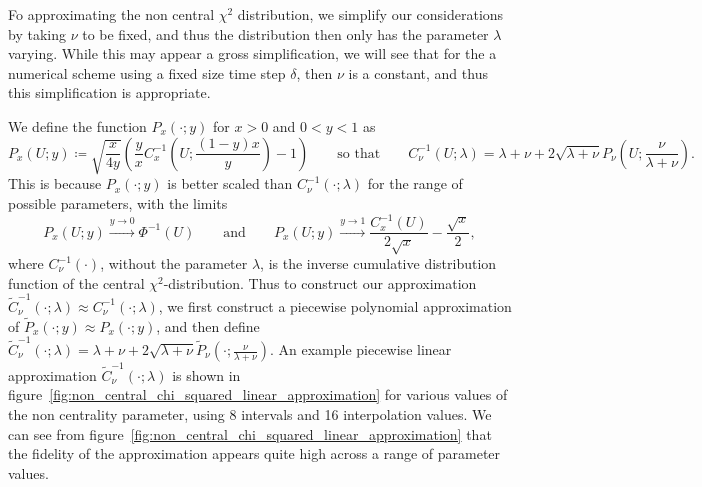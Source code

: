 \documentclass[manuscript,review]{acmart}
\begin{document}
Fo approximating the non central $ \chi^2 $ distribution, we simplify our considerations by taking $ \nu $ to be fixed, and thus the distribution then only has the parameter $ \lambda $ varying. While this may appear a gross simplification, we will see that for the a numerical scheme using a fixed size time step $ \delta $, then $ \nu $ is a constant, and thus this simplification is appropriate.  

We define the function $ P_x(\cdot;y) $ for $ x > 0 $ and $ 0 < y < 1  $ as 
\begin{equation*}
P_x(U;y) \coloneqq \sqrt{\dfrac{x}{4y}} \left( \dfrac{y}{x}  C^{-1}_{x}\left(U; \dfrac{(1 - y)x}{y}\right) - 1\right)
\qquad \text{so that} \qquad 
C^{-1}_{\nu}(U;\lambda) = \lambda + \nu + 2 \sqrt{\lambda + \nu} P_\nu\left(U;\dfrac{\nu}{\lambda + \nu}\right).
\end{equation*}
This is because $ P_x(\cdot;y) $ is better scaled than $ C^{-1}_{\nu}(\cdot;\lambda) $ for the range of possible parameters, with the limits
\begin{equation*}
P_x(U;y) \xrightarrow{y\to 0} \Phi^{-1}(U) 
\qquad \text{and} \qquad 
P_x(U;y) \xrightarrow{y\to 1} \dfrac{C^{-1}_x(U)}{2\sqrt{x}} - \dfrac{\sqrt{x}}{2},
\end{equation*}
where $ C^{-1}_\nu(\cdot) $, without the parameter $ \lambda $, is the inverse cumulative distribution function of the central $ \chi^2 $-distribution. Thus to construct our approximation $ \tilde{C}^{-1}_{\nu}(\cdot;\lambda) \approx C^{-1}_{\nu}(\cdot;\lambda) $, we first construct a piecewise polynomial approximation of  $ \tilde{P}_x(\cdot;y) \approx P_x(\cdot;y) $, and then define 
$ \tilde{C}^{-1}_{\nu}(\cdot;\lambda) = \lambda + \nu + 2 \sqrt{\lambda + \nu} \tilde{P}_\nu(\cdot;\tfrac{\nu}{\lambda + \nu}) $. An example piecewise linear approximation $  \tilde{C}^{-1}_{\nu}(\cdot;\lambda) $ is shown in figure~\ref{fig:non_central_chi_squared_linear_approximation} for various values of the non centrality parameter, using 8 intervals and 16 interpolation values. We can see from figure~\ref{fig:non_central_chi_squared_linear_approximation} that the fidelity of the approximation appears quite high across a range of parameter values. 
\end{document}
